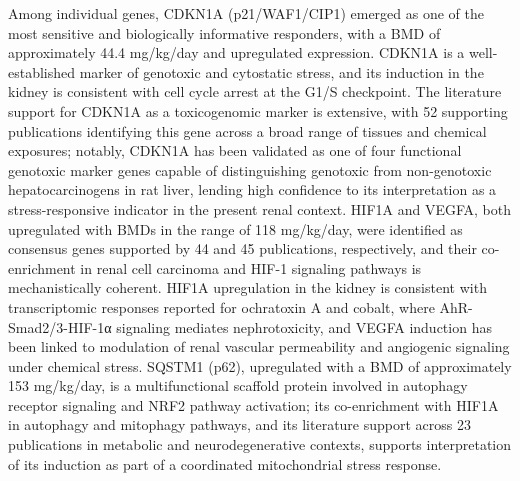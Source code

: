 Among individual genes, CDKN1A (p21/WAF1/CIP1) emerged as one of the most sensitive and biologically informative responders, with a BMD of approximately 44.4 mg/kg/day and upregulated expression. CDKN1A is a well-established marker of genotoxic and cytostatic stress, and its induction in the kidney is consistent with cell cycle arrest at the G1/S checkpoint. The literature support for CDKN1A as a toxicogenomic marker is extensive, with 52 supporting publications identifying this gene across a broad range of tissues and chemical exposures; notably, CDKN1A has been validated as one of four functional genotoxic marker genes capable of distinguishing genotoxic from non-genotoxic hepatocarcinogens in rat liver, lending high confidence to its interpretation as a stress-responsive indicator in the present renal context. HIF1A and VEGFA, both upregulated with BMDs in the range of 118 mg/kg/day, were identified as consensus genes supported by 44 and 45 publications, respectively, and their co-enrichment in renal cell carcinoma and HIF-1 signaling pathways is mechanistically coherent. HIF1A upregulation in the kidney is consistent with transcriptomic responses reported for ochratoxin A and cobalt, where AhR-Smad2/3-HIF-1α signaling mediates nephrotoxicity, and VEGFA induction has been linked to modulation of renal vascular permeability and angiogenic signaling under chemical stress. SQSTM1 (p62), upregulated with a BMD of approximately 153 mg/kg/day, is a multifunctional scaffold protein involved in autophagy receptor signaling and NRF2 pathway activation; its co-enrichment with HIF1A in autophagy and mitophagy pathways, and its literature support across 23 publications in metabolic and neurodegenerative contexts, supports interpretation of its induction as part of a coordinated mitochondrial stress response.

